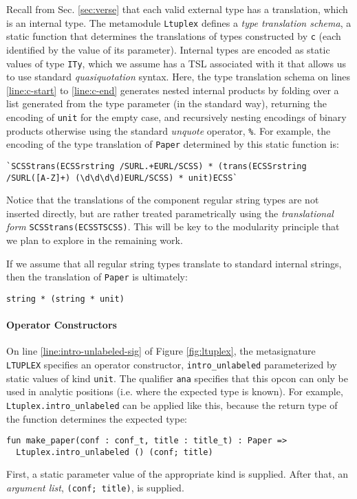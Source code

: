 Recall from Sec. \ref{sec:verse} that each valid external type has a translation, which is an internal type. The metamodule \lstinline{Ltuplex} defines a \emph{type translation schema}, a static function that determines the translations of types constructed by \lstinline{c} (each identified by the value of its parameter). Internal types are encoded as static values of type \lstinline{ITy}, which we assume has a TSL associated with it that allows us to use standard \emph{quasiquotation} syntax. Here, the  type translation schema on lines \ref{line:c-start} to \ref{line:c-end} generates nested internal products by folding over a list generated from the type parameter (in the standard way), returning the encoding of \lstinline{unit} for the empty case, and recursively nesting encodings of binary products otherwise using the standard \emph{unquote} operator, \lstinline{%}. 
For example, the encoding of the type translation of \lstinline{Paper} determined by this static function is:
\begin{lstlisting}[numbers=none]
`SCSStrans(ECSSrstring /SURL.+EURL/SCSS) * (trans(ECSSrstring /SURL([A-Z]+) (\d\d\d\d)EURL/SCSS) * unit)ECSS`
\end{lstlisting}
Notice that the translations of the component regular string types are not inserted directly, but are rather treated {parametrically} using the \emph{translational form} \lstinline{SCSStrans(ECSSTSCSS)}. This will be key to the modularity principle that we plan to explore in the remaining work.

If we assume that all regular string types translate to standard internal strings, then the translation of \lstinline{Paper} is ultimately:
\begin{lstlisting}[numbers=none]
string * (string * unit)
\end{lstlisting} 

\paragraph{Operator Constructors} On line \ref{line:intro-unlabeled-sig} of Figure \ref{fig:ltuplex}, the metasignature \lstinline{LTUPLEX} specifies an operator constructor, \lstinline{intro_unlabeled} parameterized by static values of kind \lstinline{unit}. The qualifier \lstinline{ana} specifies that this opcon can only be used in analytic positions (i.e. where the expected type is known). For example, \lstinline{Ltuplex.intro_unlabeled} can be applied like this, because the return type of the function determines the expected type:
\begin{lstlisting}[numbers=none]
fun make_paper(conf : conf_t, title : title_t) : Paper => 
  Ltuplex.intro_unlabeled () (conf; title)
\end{lstlisting}
First, a static parameter value of the appropriate kind is supplied. After that, an \emph{argument list}, \lstinline{(conf; title)}, is supplied.

